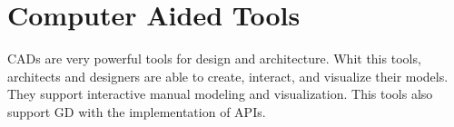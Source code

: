 

\section{Computer Aided Tools} %
\label{sec:computer_aided_tools}
\glspl{CAD} are very powerful tools for design and architecture. Whit this tools, architects and designers are able to create, interact, and visualize their models. They support interactive manual modeling and visualization. This tools also support \gls{GD} with the implementation of \glspl{API}.


		